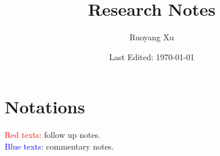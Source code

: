 \documentclass[11pt,letterpaper]{article}
\title{Research Notes}
\author{Ruoyang Xu}
\date{Last Edited: \today}
\begin{document}
\maketitle
\thispagestyle{empty}
\tableofcontents
\pagebreak
\setcounter{page}{1}

\section{Notations}

\textcolor{red}{Red texts}: follow up notes. \\
\textcolor{blue}{Blue texts}: commentary notes. 





\printbibliography
\end{document}
